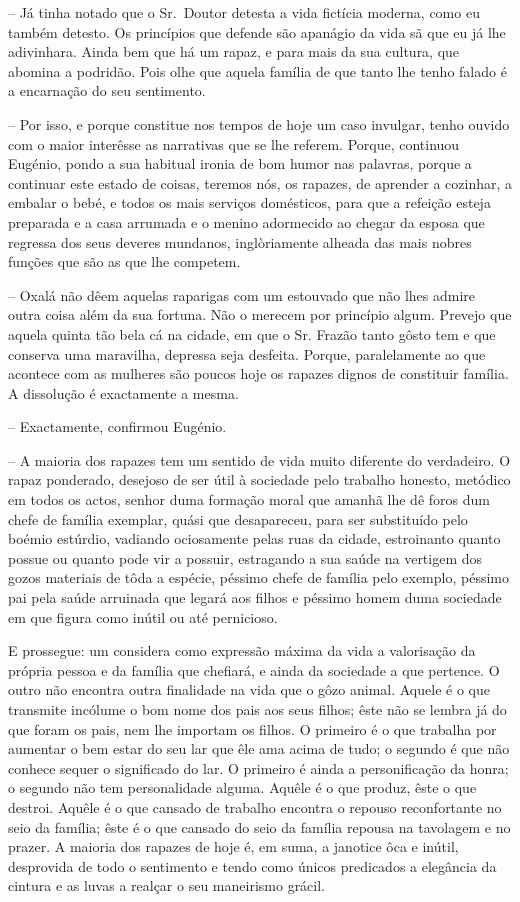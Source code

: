 \documentclass[9pt]{article}
\begin{document}
-- Já tinha notado que o Sr.\ Doutor detesta a vida fictícia moderna, como eu também detesto. Os princípios que defende são apanágio
da vida sã que eu já lhe adivinhara. Ainda bem que há um rapaz, e para mais da sua cultura, que abomina a podridão. Pois o\-lhe que aquela
fa\-mí\-lia de que tanto lhe tenho falado é a encarna\-ção do seu sentimento.

-- Por isso, e porque constitue nos
tempos de hoje um caso invulgar, tenho
ouvido com o maior interêsse as narrativas que se lhe referem. Porque,
continuou Eugé\-nio, pondo a sua habitual
ironia de bom humor nas palavras, porque a continuar este estado de coisas,
teremos nós, os rapazes, de aprender a
cozinhar, a embalar o bebé, e todos os
mais serviços domésticos, para que a
refei\-ção esteja preparada e a casa
arrumada e o menino adormecido ao chegar da esposa que regressa dos seus
deveres mundanos, inglòriamente a\-lheada das mais nobres fun\-ções que são
as que lhe competem.

-- Oxalá não dêem aquelas raparigas com um estouvado que não lhes
admire outra coisa além da sua fortuna. Não o merecem por princípio
algum. Prevejo que aquela quinta tão bela cá na cidade, em que o Sr.
Frazão tanto gôsto tem e que conserva uma maravi\-lha, depressa seja
desfeita. Porque, paralelamente ao que acontece com as mu\-lheres são
poucos hoje os rapazes dignos de constituir fa\-mí\-lia. A dissolu\-ção é
exactamente a mesma.

-- Exactamente, confirmou Eugé\-nio.

-- A maioria dos rapazes tem um sentido de vida muito diferente
do verdadeiro. O rapaz ponderado, desejoso de ser útil à sociedade
pelo traba\-lho honesto, metódico em todos os actos, senhor duma forma\-ção moral que a\-ma\-nhã lhe dê foros dum chefe de fa\-mí\-lia exemplar, quási que desapareceu, para ser substituído pelo boémio estúrdio, vadiando
ociosamente pelas ruas da cidade, estroinanto quanto possue ou quanto
pode vir a possuir, estragando a sua saúde na vertigem dos gozos materiais de tôda a espécie, péssimo chefe de fa\-mí\-lia pelo exemplo, péssimo
pai pela saúde arruinada que legará aos fi\-lhos e péssimo homem duma
sociedade em que figura como inútil ou até pernicioso.

E prossegue: um considera como ex\-pres\-são máxima da vida a valorisa\-ção da própria pessoa e da fa\-mí\-lia que chefiará, e ainda da sociedade a que pertence. O outro não encontra outra finalidade na vida
que o gôzo animal. Aquele é o que transmite incólume o bom nome dos
pais aos seus fi\-lhos; êste não se lembra já do que foram os pais, nem lhe
importam os fi\-lhos. O primeiro é o que traba\-lha por aumentar o bem
estar do seu lar que êle ama acima de tudo; o segundo é que não conhece sequer o signifi\-cado do lar. O primeiro é ainda a personifi\-ca\-ção
da honra; o segundo não tem personalidade alguma. Aquêle é o que produz, êste o que destroi. Aquêle é o que cansado de traba\-lho encontra
o repouso reconfortante no seio da fa\-mí\-lia; êste é o que cansado do
seio da fa\-mí\-lia repousa na tavolagem e no prazer. A maioria dos rapazes de hoje é, em suma, a janotice ôca e inútil, desprovida de todo o
sentimento e tendo como únicos predicados a elegância da cintura e
as luvas a realçar o seu maneirismo grácil.
\end{document}
